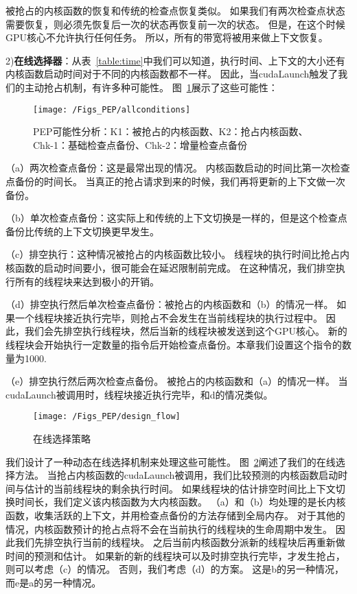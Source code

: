 被抢占的内核函数的恢复和传统的检查点恢复类似。
如果我们有两次检查点状态需要恢复，则必须先恢复后一次的状态再恢复前一次的状态。
但是，在这个时候GPU核心不允许执行任何任务。
所以，所有的带宽将被用来做上下文恢复。

2)\textbf{在线选择器}：从表~\ref{table:time}中我们可以知道，执行时间、上下文的大小还有内核函数启动时间对于不同的内核函数都不一样。
因此，当cudaLaunch触发了我们的主动抢占机制，有许多种可能性。
图~\ref{fig:allconditions}展示了这些可能性：


\begin{figure}[htbp] %
  \centering
  \texttt{[image: /Figs\_PEP/allconditions]}
  \caption{PEP可能性分析：K1：被抢占的内核函数、K2：抢占内核函数、Chk-1：基础检查点备份、Chk-2：增量检查点备份}
  \label{fig:allconditions}
\end{figure}

（a）两次检查点备份：这是最常出现的情况。
内核函数启动的时间比第一次检查点备份的时间长。
当真正的抢占请求到来的时候，我们再将更新的上下文做一次备份。

（b）单次检查点备份：这实际上和传统的上下文切换是一样的，但是这个检查点备份比传统的上下文切换更早发生。

（c）排空执行：这种情况被抢占的内核函数比较小。
线程块的执行时间比抢占内核函数的启动时间要小，很可能会在延迟限制前完成。
在这种情况，我们排空执行所有的线程块来达到极小的开销。

（d）排空执行然后单次检查点备份：被抢占的内核函数和（b）的情况一样。
如果一个线程块接近执行完毕，则抢占不会发生在当前线程块的执行过程中。
因此，我们会先排空执行线程块，然后当新的线程块被发送到这个GPU核心。
新的线程块会开始执行一定数量的指令后开始检查点备份。本章我们设置这个指令的数量为1000.

（e）排空执行然后两次检查点备份。
被抢占的内核函数和（a）的情况一样。
当cudaLaunch被调用时，线程块接近执行完毕，和d的情况类似。

\begin{figure}[htbp] %
  \centering
  \texttt{[image: /Figs\_PEP/design\_flow]}
  \caption{在线选择策略}
  \label{fig:design_flow}
\end{figure}

我们设计了一种动态在线选择机制来处理这些可能性。
图~\ref{fig:design_flow}阐述了我们的在线选择方法。
当抢占内核函数的cudaLaunch被调用，我们比较预测的内核函数启动时间与估计的当前线程块的剩余执行时间。
如果线程块的估计排空时间比上下文切换时间长，我们定义该内核函数为大内核函数。
（a）和（b）均处理的是长内核函数，收集活跃的上下文，并用检查点备份的方法存储到全局内存。
对于其他的情况，内核函数预计的抢占点将不会在当前执行的线程块的生命周期中发生。
因此我们先排空执行当前的线程块。
之后当前内核函数分派新的线程块后再重新做时间的预测和估计。
如果新的新的线程块可以及时排空执行完毕，才发生抢占，则可以考虑（c）的情况。
否则，我们考虑（d）的方案。
这是b的另一种情况，而e是a的另一种情况。



